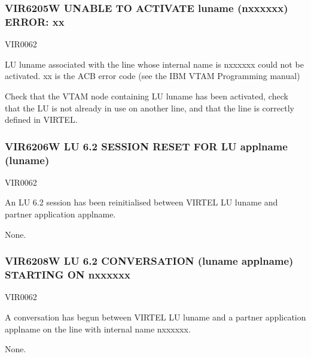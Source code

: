 \documentclass[letterpaper,10pt,english]{sphinxmanual}
\begin{document}
\subsubsection{VIR6205W UNABLE TO ACTIVATE luname (n\sphinxhyphen{}xxxxxx) ERROR: xx}
\label{\detokenize{messages:vir6205w-unable-to-activate-luname-n-xxxxxx-error-xx}}\begin{description}
\sphinxAtStartPar
VIR0062

\sphinxAtStartPar
LU luname associated with the line whose internal name is n\sphinxhyphen{}xxxxxx could not be activated. xx is the ACB error code (see the IBM VTAM Programming manual)

\sphinxAtStartPar
Check that the VTAM node containing LU luname has been activated, check that the LU is not already in use on another line, and that the line is correctly defined in VIRTEL.

\end{description}


\subsubsection{VIR6206W LU 6.2 SESSION RESET FOR LU applname (luname)}
\label{\detokenize{messages:vir6206w-lu-6-2-session-reset-for-lu-applname-luname}}\begin{description}
\sphinxAtStartPar
VIR0062

\sphinxAtStartPar
An LU 6.2 session has been reinitialised between VIRTEL LU luname and partner application applname.

\sphinxAtStartPar
None.

\end{description}


\subsubsection{VIR6208W LU 6.2 CONVERSATION (luname \textendash{} applname) STARTING ON n\sphinxhyphen{}xxxxxx}
\label{\detokenize{messages:vir6208w-lu-6-2-conversation-luname-applname-starting-on-n-xxxxxx}}\begin{description}
\sphinxAtStartPar
VIR0062

\sphinxAtStartPar
A conversation has begun between VIRTEL LU luname and a partner application applname on the line with internal name n\sphinxhyphen{}xxxxxx.

\sphinxAtStartPar
None.

\end{description}
\end{document}
